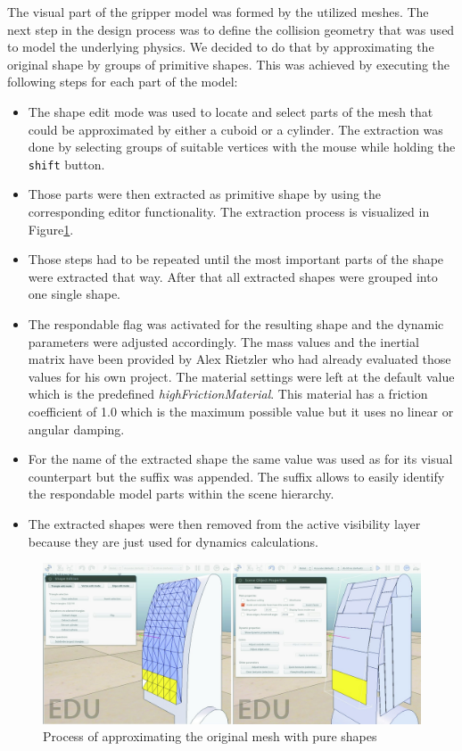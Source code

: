 The visual part of the gripper model was formed by the utilized meshes. The next step in the design process was to define the collision geometry that was used to model the underlying physics. We decided to do that by approximating the original shape by groups of primitive shapes. This was achieved by executing the following steps for each part of the model:
\begin{itemize}
\item
The shape edit mode was used to locate and select parts of the mesh that could be approximated by either a cuboid or a cylinder. The extraction was done by selecting groups of suitable vertices with the mouse while holding the \texttt{shift} button.
\item
Those parts were then extracted as primitive shape by using the corresponding editor functionality.
The extraction process is visualized in Figure\ref{fig:ex_pure_shape}.
\item
Those steps had to be repeated until the most important parts of the shape were extracted that way. After that all extracted shapes were grouped into one single shape.
\item
The respondable flag was activated for the resulting shape and the dynamic parameters were adjusted accordingly. The mass values and the inertial matrix have been provided by Alex Rietzler who had already evaluated those values for his own project. The material settings were left at the default value which is the predefined \emph{highFrictionMaterial}. This material has a friction coefficient of 1.0 which is the maximum possible value but it uses no linear or angular damping.
\item
For the name of the extracted shape the same value was used as for its visual counterpart but the  suffix was appended. The suffix allows to easily identify the respondable model parts within the scene hierarchy. 

\item
The extracted shapes were then removed from the active visibility layer because they are just used for dynamics calculations.
\end{itemize}

\begin{figure}[ht]
	\centering
  	\includegraphics[width=1.0\textwidth]{images/extract_pure_shapes.jpg}
	\caption{Process of approximating the original mesh with pure shapes}
	\label{fig:ex_pure_shape}
\end{figure}

